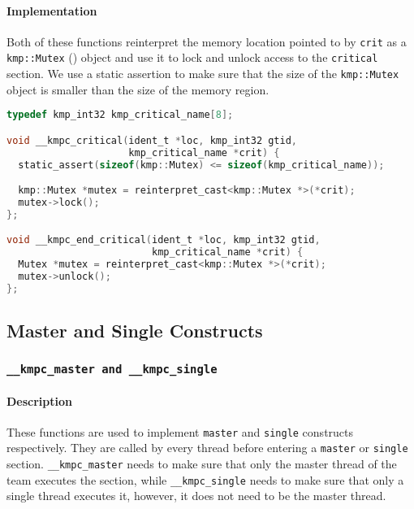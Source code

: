 \paragraph{Implementation} Both of these functions reinterpret the memory location pointed to by
\texttt{crit} as a \texttt{kmp::Mutex} () object and use it to lock and unlock access to
the \texttt{critical} section. We use a static assertion to make sure that the size of the
\texttt{kmp::Mutex} object is smaller than the size of the memory region.

\begin{lstlisting}[language=C, caption={__kmpc_critical and __kmpc_end_critical},
                   label={lst:kmpc-critical}, escapechar=@]
typedef kmp_int32 kmp_critical_name[8];

void __kmpc_critical(ident_t *loc, kmp_int32 gtid,
                     kmp_critical_name *crit) {
  static_assert(sizeof(kmp::Mutex) <= sizeof(kmp_critical_name));

  kmp::Mutex *mutex = reinterpret_cast<kmp::Mutex *>(*crit);
  mutex->lock();
};

void __kmpc_end_critical(ident_t *loc, kmp_int32 gtid,
                         kmp_critical_name *crit) {
  Mutex *mutex = reinterpret_cast<kmp::Mutex *>(*crit);
  mutex->unlock();
};
\end{lstlisting}

\subsection{Master and Single Constructs}

\subsubsection{\texttt{__kmpc_master and __kmpc_single}}

\paragraph{Description} These functions are used to implement \texttt{master} and \texttt{single}
constructs respectively. They are called by every thread before entering a \texttt{master} or
\texttt{single} section. \texttt{\_\_kmpc\_master} needs to make sure that only the master thread of
the team executes the section, while \texttt{\_\_kmpc\_single} needs to make sure that only a single
thread executes it, however, it does not need to be the master thread.


